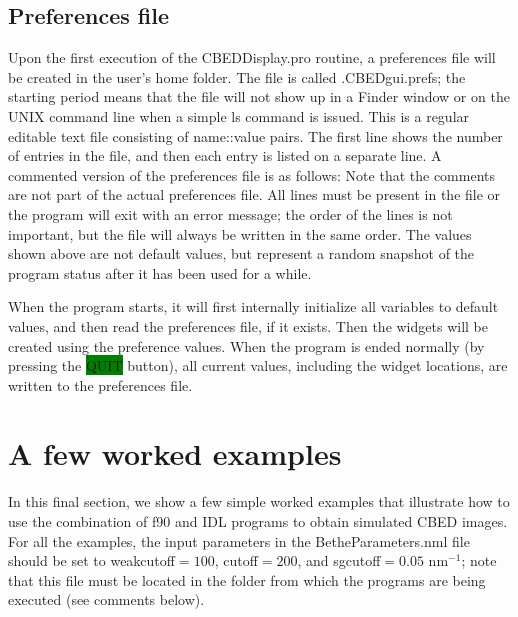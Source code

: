 \documentclass[DIV=calc, paper=letter, fontsize=11pt]{scrartcl}	 %
\newcommand{\button}[1]{\colorbox{green}{\textsf{#1}} button}
\begin{document}
\subsection{Preferences file\label{sec:idlpref}}
Upon the first execution of the \textsf{CBEDDisplay.pro} routine, a preferences file will be created in the user's home folder.  The file is called \textsf{.CBEDgui.prefs}; the starting period
means that the file will not show up in a Finder window or on the UNIX command line when a simple \textsf{ls} command is issued.  This is a 
regular editable text file consisting of name::value pairs.  The first line shows the number of entries in the file, and then each entry is listed on a 
separate line.  A commented version of the preferences file is as follows:
Note that the comments are not part of the actual preferences file.  All lines must be present in the file or the program will exit with an error message; the order 
of the lines is not important, but the file will always be written in the same order.
The values shown above are not default values, but represent a random snapshot of the program status after it has been used for a while.

When the program starts, it will first internally initialize all variables to default values, and then read the preferences
file, if it exists.  Then the widgets will be created using the preference values.  When the program is ended normally (by
pressing the \button{QUIT}), all current values, including the widget locations, are written to the preferences
file.



\newpage
\section{A few worked examples\label{sec:examples}}
In this final section, we show a few simple worked examples that illustrate how to use the combination of f90 and IDL programs 
to obtain simulated CBED images.  For all the examples, the input parameters in the \textsf{BetheParameters.nml} file 
should be set to \textsf{weakcutoff}$= 100$, \textsf{cutoff}$= 200$, and \textsf{sgcutoff}$=0.05$ nm$^{-1}$; note that this 
file must be located in the folder from which the programs are being executed (see comments below).
\end{document}

